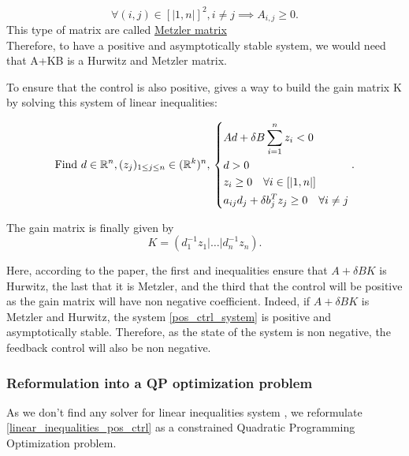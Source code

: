 \documentclass[12pt]{article}
\begin{document}
\begin{equation*}
    \forall (i,j) \in [|1,n|]^2, i\neq j \implies A_{i,j} \geq 0.
\end{equation*}
This type of matrix are called \underline{Metzler matrix}
\\

Therefore, to have a positive and asymptotically stable system, we would need that A+KB is a Hurwitz and Metzler matrix. 

To ensure that the control is also positive, \cite{pos_ctrl_paper} gives a way to build the gain matrix K by solving this system of linear inequalities: 


\begin{equation}\label{linear_inequalities_pos_ctrl}
\text{Find } d\in \mathbb{R}^n,(z_j)_{1\leq j \leq n}\in (\mathbb{R}^k)^n, \quad \\
    \left\{ 
\begin{aligned}
&Ad+\delta B\sum_{i=1}^n z_i <0 \\
&d>0\\
&z_i \geq 0 \quad \forall i \in  [|1,n|]\\
&a_{ij}d_j + \delta b_j^Tz_j\geq 0 \quad \forall i\neq j 
\end{aligned}
\right. .
\end{equation}

The gain matrix is finally given by 
\begin{equation}
\boxed{
    K = (d_1^{-1}z_1| \dots |d_n^{-1}z_n).
}
\end{equation}

Here, according to the paper, the first and inequalities ensure that $A+\delta BK$ is Hurwitz, the last that it is Metzler, and the third that the control will be positive as the gain matrix will have non negative coefficient. Indeed, if $A+\delta BK$ is Metzler and Hurwitz, the system \eqref{pos_ctrl_system} is positive and asymptotically stable. Therefore, as the state of the system is non negative, the feedback control will also be non negative. 

\subsubsection{Reformulation into a QP optimization problem}
As we don't find any solver for linear inequalities system , we reformulate  \eqref{linear_inequalities_pos_ctrl} as a constrained Quadratic Programming Optimization problem.
\\
\end{document}
